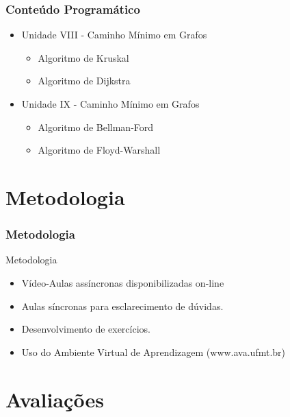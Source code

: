 \documentclass[aspectratio=169]{beamer}
\begin{document}

\begin{frame}
\frametitle{Conteúdo Programático}
\begin{itemize}
  \item Unidade VIII - Caminho Mínimo em Grafos
  \begin{itemize}
  \item Algoritmo de Kruskal
  \item Algoritmo de Dijkstra
  \end{itemize}
   \item Unidade IX - Caminho Mínimo em Grafos
  \begin{itemize}
  \item Algoritmo de Bellman-Ford
  \item Algoritmo de Floyd-Warshall  
  \end{itemize}
  
\end{itemize}
 \end{frame}

\section{Metodologia}

\begin{frame}
\frametitle{Metodologia}
Metodologia
\begin{itemize}
 \item Vídeo-Aulas assíncronas disponibilizadas on-line
 \item Aulas síncronas para esclarecimento de dúvidas.
 \item Desenvolvimento de exercícios.
 \item Uso do Ambiente Virtual de Aprendizagem (www.ava.ufmt.br)
\end{itemize}
\end{frame}

\section{Avaliações}
\end{document}
